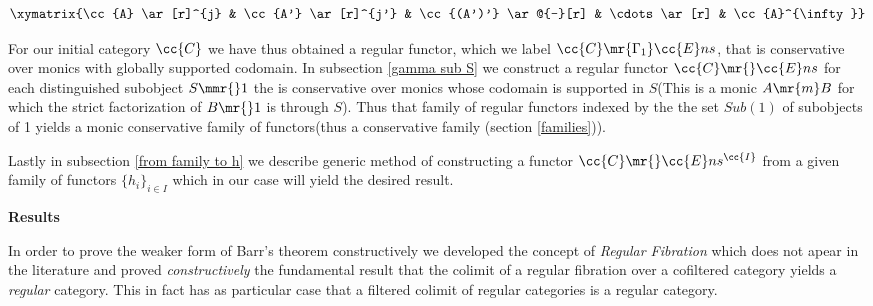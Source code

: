 \[
\xymatrix{\cc{A} \ar[r]^{j} & \cc{A'} \ar[r]^{j'} & \cc{(A')'} \ar@{-}[r] & \cdots \ar [r] & \cc{A}^{\infty}}
\]

\vspace{1ex}

For our initial category $\cc{C}$ we have thus obtained a regular functor, which we label $\cc{C} \mr{\Gamma_1} \cc{E}ns$, that is conservative over monics with globally supported codomain. In subsection \ref{gamma sub S} we construct a regular functor $\cc{C} \mr{} \cc{E}ns$ for each distinguished subobject ${S \mmr{} 1}$ the is conservative over monics whose codomain is supported in $S$(This is a monic $A \mr{m} B$ for which the strict factorization of $B \mr{} 1$ is through $S$). Thus that family of regular functors indexed by the the set $Sub(1)$ of subobjects of 1 yields a monic conservative family of functors(thus a conservative family (section \ref{families})). 

Lastly in subsection \ref{from family to h} we describe  generic method of constructing a functor $\cc{C} \mr{} \cc{E}ns^{\cc{I}}$  from a given family of functors $\{h_i\}_{i \in I}$ which in our case will yield the desired result.

\vspace{1ex}

{\bf Results}

In order to prove the weaker form of Barr's theorem constructively we developed the concept of \emph{Regular Fibration} which does not apear in the literature and proved \textit{constructively} the fundamental result that the colimit of a regular fibration over a cofiltered category yields a \emph{regular} category. This in fact has as particular case that a filtered colimit of regular categories is a regular category.